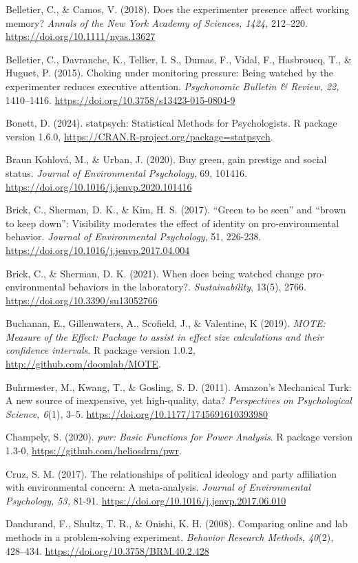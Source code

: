 \documentclass[
]{article}
\begin{document}
Belletier, C., \& Camos, V. (2018). Does the experimenter presence
affect working memory? \emph{Annals of the New York Academy of Sciences,
1424,} 212--220. \url{https://doi.org/10.1111/nyas.13627}

Belletier, C., Davranche, K., Tellier, I. S., Dumas, F., Vidal, F.,
Hasbroucq, T., \& Huguet, P. (2015). Choking under monitoring pressure:
Being watched by the experimenter reduces executive attention.
\emph{Psychonomic Bulletin \& Review, 22,} 1410--1416.
\url{https://doi.org/10.3758/s13423-015-0804-9}

Bonett, D. (2024). statpsych: Statistical Methods for Psychologists. R
package version 1.6.0,
\url{https://CRAN.R-project.org/package=statpsych}.

Braun Kohlová, M., \& Urban, J. (2020). Buy green, gain prestige and
social status. \emph{Journal of Environmental Psychology}, 69, 101416.
\url{https://doi.org/10.1016/j.jenvp.2020.101416}

Brick, C., Sherman, D. K., \& Kim, H. S. (2017). ``Green to be seen''
and ``brown to keep down'': Visibility moderates the effect of identity
on pro-environmental behavior. \emph{Journal of Environmental
Psychology}, 51, 226-238.
\url{https://doi.org/10.1016/j.jenvp.2017.04.004}

Brick, C., \& Sherman, D. K. (2021). When does being watched change
pro-environmental behaviors in the laboratory?. \emph{Sustainability},
13(5), 2766. \url{https://doi.org/10.3390/su13052766}

Buchanan, E., Gillenwaters, A., Scofield, J., \& Valentine, K (2019).
\emph{MOTE: Measure of the Effect: Package to assist in effect size
calculations and their confidence intervals}. R package version 1.0.2,
\url{http://github.com/doomlab/MOTE}.

Buhrmester, M., Kwang, T., \& Gosling, S. D. (2011). Amazon's Mechanical
Turk: A new source of inexpensive, yet high-quality, data?
\emph{Perspectives on Psychological Science, 6}(1), 3--5.
\url{https://doi.org/10.1177/1745691610393980}

Champely, S. (2020). \emph{pwr: Basic Functions for Power Analysis}. R
package version 1.3-0, \url{https://github.com/heliosdrm/pwr}.

Cruz, S. M. (2017). The relationships of political ideology and party
affiliation with environmental concern: A meta-analysis. \emph{Journal
of Environmental Psychology, 53,} 81-91.
\url{https://doi.org/10.1016/j.jenvp.2017.06.010}

Dandurand, F., Shultz, T. R., \& Onishi, K. H. (2008). Comparing online
and lab methods in a problem-solving experiment. \emph{Behavior Research
Methods, 40}(2), 428--434. \url{https://doi.org/10.3758/BRM.40.2.428}
\end{document}
